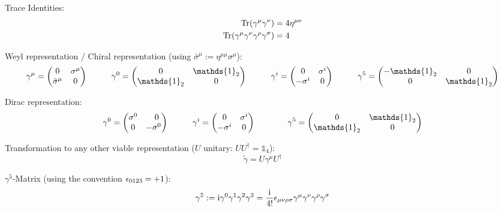 			\noindent
			Trace Identities:
			\begin{align}
				\Tr(\gamma^\mu \gamma^\nu) &= 4 \eta^{\mu\nu} \\
				\Tr(\gamma^\mu \gamma^\nu \gamma^\rho \gamma^\sigma) &= 4
			\end{align}

			\noindent
			Weyl representation / Chiral representation  (using $\bar{\sigma}^\mu := \eta^{\mu\mu}\sigma^\mu$):
			\begin{equation}
				\gamma^\mu = \mqty(
				0 & \sigma^\mu \\
				\bar{\sigma}^\mu & 0
				)
				\hsp
				\gamma^0 = \mqty(
				0 & \mathds{1}_2 \\
				\mathds{1}_2 & 0
				)
				\hsp
				\gamma^i = \mqty(
				0 & \sigma^i \\
				-\sigma^i & 0
				)
				\hsp
				\gamma^5 = \mqty(
				-\mathds{1}_2 & 0 \\
				0 & \mathds{1}_2
				)
			\end{equation}

			\noindent
			Dirac representation:
			\begin{equation}
				\begin{aligned}
					\gamma^0
					= \left( \begin{matrix}
							\sigma^0 & \M0       \\
							0        & -\sigma^0
						\end{matrix} \right)
					&\hsp
					\gamma^i = \mqty(
					0 & \sigma^i \\
					-\sigma^i & 0
					)
					&\hsp
					\gamma^5 = \mqty(
					0 & \mathds{1}_2 \\
					\mathds{1}_2 & 0
					)
				\end{aligned}
			\end{equation}

			\noindent
			Transformation to any other viable representation ($U$ unitary: $U U^\dagger=\mathds{1}_4$):
			\begin{equation}
				\tilde{\gamma} = U \gamma^\mu U^\dagger
			\end{equation}

			\noindent
			$\gamma^5$-Matrix (using the convention $\epsilon_{0123} = +1$):
			\begin{equation}
				\gamma^5 := \mathrm{i}\gamma^0 \gamma^1 \gamma^2 \gamma^3
				= \frac{\mathrm{i}}{4!}\epsilon_{\mu\nu\rho\sigma} \gamma^\mu \gamma^\nu \gamma^\rho \gamma^\sigma
			\end{equation}

